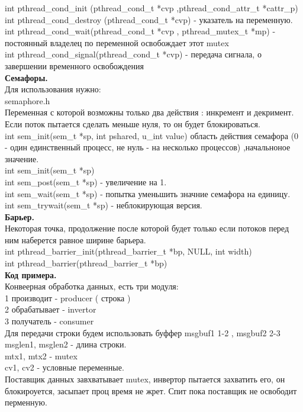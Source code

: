 int pthread_cond_init (pthread_cond_t *cvp ,pthread_cond_attr_t *cattr_p)\\
int pthread_cond_destroy (pthread_cond_t *cvp) - указатель на переменную. \\
int pthread_cond_wait(pthread_cond_t *cvp , pthread_mutex_t *mp) - постоянный владелец по переменной освобождает этот mutex \\
int pthread_cond_signal(pthread_cond_t *cvp) - передача сигнала, о завершении временного освобождения \\

\Large{ \textbf { Семафоры. }}\\
Для использования нужно:\\
semaphore.h\\
Переменная с которой возможны только два действия : инкремент и декримент.\\
Если поток пытается сделать меньше нуля, то он будет блокироваться.\\

int sem_init(sem_t *sp, int pshared, u_int value)
область действия семафора (0 - один единственный процесс, не нуль - на несколько процессов) ,начальноное значение.\\
int sem_init(sem_t *sp)\\
int sem_post(sem_t *sp) - увеличение на 1. \\
int sem_wait(sem_t *sp) - попытка уменьшить значние семафора на единицу.\\
int sem_trywait(sem_t *sp) - неблокирующая версия.\\

\Large{ \textbf { Барьер. }}\\

Некоторая точка, продолжение после которой будет только если потоков перед ним наберется равное ширине барьера.\\
int pthread_barrier_init(pthread_barrier_t *bp, NULL, int width)\\
int pthread_barrier(pthread_barrier_t *bp)\\

\Large{ \textbf { Код примера. }}\\
Конвеерная обработка данных, есть три модуля:\\
1 производит - producer ( строка )\\
2 обрабатывает - invertor \\
3 получатель - consumer\\
Для передачи строки будем использовать буффер msgbuf1 1-2 , msgbuf2 2-3 \\
msglen1, msglen2 - длина строки.\\
mtx1, mtx2 - mutex \\
cv1, cv2 - условные переменные.\\

Поставщик данных завхватывает mutex, инвертор пытается захватить его, он блокироуется,
засыпает проц время не жрет. Спит пока поставщик не освободит перменную.
